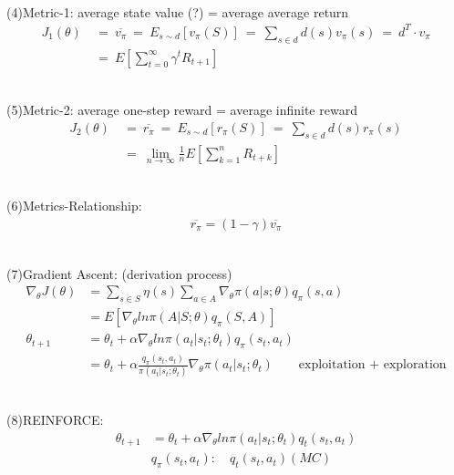 \documentclass{article}
\begin{document}
~ \\[3pt]
(4)Metric-1: average state value (?) = average average return 
\begin{align*}
    J_{1} (\theta) & \ = \ \overline{v_{\pi}} 
                     \ = \ E_{s \sim d} [ v_{\pi}(S) ] 
                     \ = \ \sum_{s \in d} d(s) v_{\pi}(s) 
                     \ = \ d^{T} \cdot v_{\pi} \\[3pt]
                   & \ = \ E \left[ \sum_{t = 0}^{\infty} 
                                    \gamma^{t} R_{t+1} \right] 
\end{align*}

~ \\[3pt]
(5)Metric-2: average one-step reward = average infinite reward 
\begin{align*}
    J_{2} (\theta) & \ = \ \overline{r_{\pi}} 
                     \ = \ E_{s \sim d} [ r_{\pi}(S) ] 
                     \ = \ \sum_{s \in d} d(s) r_{\pi}(s) \\[3pt]
                   & \ = \ \lim_{n \to \infty} \frac{1}{n} 
                     E \left[ \sum_{k = 1}^{n} R_{t+k} \right] 
\end{align*}

~ \\[3pt]
(6)Metrics-Relationship: 
\begin{align*}
    \overline{r_{\pi}} = (1 - \gamma) \overline{v_{\pi}} 
\end{align*}

~ \\[3pt]
(7)Gradient Ascent: (derivation process) 
\begin{align*}
    \nabla_{\theta} J(\theta) &= \sum_{s \in S} \eta (s) 
    \sum_{a \in A} \nabla_{\theta} \pi (a | s; \theta) q_{\pi} (s, a) \\[3pt]
    &= E \left[ \nabla_{\theta} ln \pi (A | S; \theta) q_{\pi} (S, A) \right] \\[3pt]
    \theta_{t+1} &= \theta_{t} + \alpha \nabla_{\theta} 
                    ln \pi (a_{t} | s_{t}; \theta_{t}) q_{\pi} (s_{t}, a_{t}) \\[3pt]
                 &= \theta_{t} + \alpha 
                 \frac{q_{\pi} (s_{t}, a_{t})}{\pi (a_{t} | s_{t}; \theta_{t})} 
                 \nabla_{\theta} \pi (a_{t} | s_{t}; \theta_{t}) 
                 \qquad \text{exploitation + exploration} 
\end{align*}

~ \\[3pt]
(8)REINFORCE: 
\begin{align*}
    \theta_{t+1} &= \theta_{t} + \alpha \nabla_{\theta} 
                    ln \pi (a_{t} | s_{t}; \theta_{t}) q_{t} (s_{t}, a_{t}) \\[3pt]
    & q_{\pi} (s_{t}, a_{t}) : \quad q_{t} (s_{t}, a_{t}) (MC) 
\end{align*}
\end{document}

